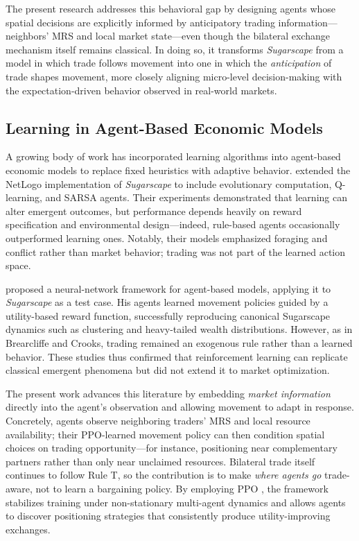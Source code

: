 \documentclass[pdflatex,sn-mathphys-num]{sn-jnl}%
\theoremstyle{thmstyleone}%
\theoremstyle{thmstyletwo}%
\theoremstyle{thmstylethree}%
\begin{document}
The present research addresses this behavioral gap by designing agents whose spatial decisions are explicitly informed by anticipatory trading information---neighbors' MRS and local market state---even though the bilateral exchange mechanism itself remains classical.  
In doing so, it transforms \textit{Sugarscape} from a model in which trade follows movement into one in which the \emph{anticipation} of trade shapes movement, more closely aligning micro-level decision-making with the expectation-driven behavior observed in real-world markets.


\subsection{Learning in Agent-Based Economic Models}
A growing body of work has incorporated learning algorithms into agent-based economic models to replace fixed heuristics with adaptive behavior.  
\citet{BrearcliffeCrooks2020} extended the NetLogo implementation of \textit{Sugarscape} to include evolutionary computation, Q-learning, and SARSA agents.  
Their experiments demonstrated that learning can alter emergent outcomes, but performance depends heavily on reward specification and environmental design---indeed, rule-based agents occasionally outperformed learning ones.  
Notably, their models emphasized foraging and conflict rather than market behavior; trading was not part of the learned action space.

\citet{Jager2021} proposed a neural-network framework for agent-based models, applying it to \textit{Sugarscape} as a test case.  
His agents learned movement policies guided by a utility-based reward function, successfully reproducing canonical Sugarscape dynamics such as clustering and heavy-tailed wealth distributions.  
However, as in Brearcliffe and Crooks, trading remained an exogenous rule rather than a learned behavior.  
These studies thus confirmed that reinforcement learning can replicate classical emergent phenomena but did not extend it to market optimization.

The present work advances this literature by embedding \emph{market information} directly into the agent's observation and allowing movement to adapt in response.  
Concretely, agents observe neighboring traders' MRS and local resource availability; their PPO-learned movement policy can then condition spatial choices on trading opportunity---for instance, positioning near complementary partners rather than only near unclaimed resources.  
Bilateral trade itself continues to follow Rule T, so the contribution is to make \emph{where agents go} trade-aware, not to learn a bargaining policy.  
By employing PPO \citep{Schulman2017}, the framework stabilizes training under non-stationary multi-agent dynamics and allows agents to discover positioning strategies that consistently produce utility-improving exchanges.
\end{document}
